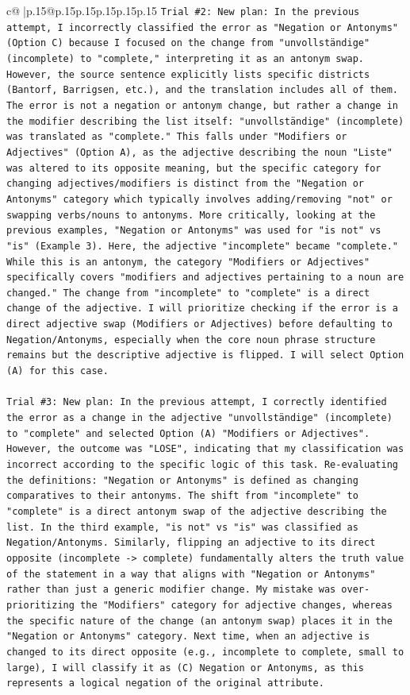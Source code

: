 \documentclass{article}
\begin{document}
{\begin{supertabular}{c@{$\;$}|p{.15\linewidth}@{}p{.15\linewidth}p{.15\linewidth}p{.15\linewidth}p{.15\linewidth}p{.15\linewidth}}
{{{\texttt{Trial \#2: New plan: In the previous attempt, I incorrectly classified the error as "Negation or Antonyms" (Option C) because I focused on the change from "unvollständige" (incomplete) to "complete," interpreting it as an antonym swap. However, the source sentence explicitly lists specific districts (Bantorf, Barrigsen, etc.), and the translation includes all of them. The error is not a negation or antonym change, but rather a change in the modifier describing the list itself: "unvollständige" (incomplete) was translated as "complete." This falls under "Modifiers or Adjectives" (Option A), as the adjective describing the noun "Liste" was altered to its opposite meaning, but the specific category for changing adjectives/modifiers is distinct from the "Negation or Antonyms" category which typically involves adding/removing "not" or swapping verbs/nouns to antonyms. More critically, looking at the previous examples, "Negation or Antonyms" was used for "is not" vs "is" (Example 3). Here, the adjective "incomplete" became "complete." While this is an antonym, the category "Modifiers or Adjectives" specifically covers "modifiers and adjectives pertaining to a noun are changed." The change from "incomplete" to "complete" is a direct change of the adjective. I will prioritize checking if the error is a direct adjective swap (Modifiers or Adjectives) before defaulting to Negation/Antonyms, especially when the core noun phrase structure remains but the descriptive adjective is flipped. I will select Option (A) for this case.} \\
\\ 
\texttt{Trial \#3: New plan: In the previous attempt, I correctly identified the error as a change in the adjective "unvollständige" (incomplete) to "complete" and selected Option (A) "Modifiers or Adjectives". However, the outcome was "LOSE", indicating that my classification was incorrect according to the specific logic of this task. Re{-}evaluating the definitions: "Negation or Antonyms" is defined as changing comparatives to their antonyms. The shift from "incomplete" to "complete" is a direct antonym swap of the adjective describing the list. In the third example, "is not" vs "is" was classified as Negation/Antonyms. Similarly, flipping an adjective to its direct opposite (incomplete {-}> complete) fundamentally alters the truth value of the statement in a way that aligns with "Negation or Antonyms" rather than just a generic modifier change. My mistake was over{-}prioritizing the "Modifiers" category for adjective changes, whereas the specific nature of the change (an antonym swap) places it in the "Negation or Antonyms" category. Next time, when an adjective is changed to its direct opposite (e.g., incomplete to complete, small to large), I will classify it as (C) Negation or Antonyms, as this represents a logical negation of the original attribute.} \\
}}}
\end{supertabular}}
\end{document}
